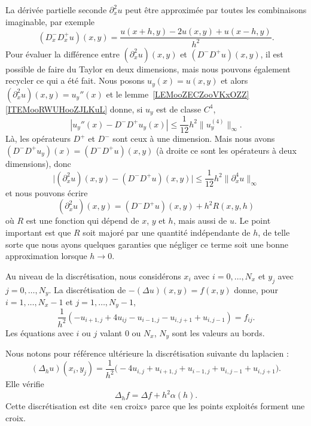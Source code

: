 La dérivée partielle seconde \( \partial^2_xu\) peut être approximée par toutes les combinaisons imaginable, par exemple
\begin{equation}
	(D^-_xD^+_xu)(x,y)=\frac{ u(x+h,y)-2u(x,y)+u(x-h,y) }{ h^2 }.
\end{equation}
Pour évaluer la différence entre \( (\partial^2_xu)(x,y)\) et \( (D^-D^+u)(x,y)\), il est possible de faire du Taylor en deux dimensions, mais nous pouvons également recycler ce qui a été fait. Nous posons \( u_y(x)=u(x,y)\) et alors \( (\partial_x^2u)(x,y)=u_y''(x)\) et le lemme~\ref{LEMooZECZooVKxOZZ}\ref{ITEMooRWUHooZJLKuL} donne, si \( u_y\) est de classe \( C^4\),
\begin{equation}
	| u_y''(x)-D^-D^+u_y(x) |\leq \frac{1}{ 12 }h^2\| u_y^{(4)} \|_{\infty}.
\end{equation}
Là, les opérateurs \( D^+\) et \( D^-\) sont ceux à une dimension. Mais nous avons \( (D^-D^+u_y)(x)=(D^-D^+u)(x,y)\) (à droite ce sont les opérateurs à deux dimensions), donc
\begin{equation}
	\big| (\partial^2_xu)(x,y)-(D^-D^+u)(x,y) \big|\leq \frac{1}{ 12 }h^2\| \partial^4_xu \|_{\infty}
\end{equation}
et nous pouvons écrire
\begin{equation}        \label{EQooCLSCooYLYJkU}
	(\partial^2_xu)(x,y)=(D^-D^+u)(x,y)+h^2R(x,y,h)
\end{equation}
où \( R\) est une fonction qui dépend de \( x\), \( y\) et \( h\), mais aussi de \( u\). Le point important est que \( R\) soit majoré par une quantité indépendante de \( h\), de telle sorte que nous ayons quelques garanties que négliger ce terme soit une bonne approximation lorsque \( h\to 0\).

Au niveau de la discrétisation, nous considérons \( x_i\) avec \( i=0,\ldots, N_x\) et \( y_j\) avec \( j=0,\ldots, N_y\). La discrétisation de \( -(\Delta u)(x,y)=f(x,y)\) donne, pour \( i=1,\ldots, N_x-1\) et \( j=1,\ldots, N_y-1\),
\begin{equation}        \label{EQooPWXBooPimUrU}
	\frac{1}{ h^2 }(-u_{i+1,j}+4u_{ij}-u_{i-1,j}-u_{i,j+1}+u_{i,j-1})=f_{ij}.
\end{equation}
Les équations avec \( i\) ou \( j\) valant \( 0\) ou \( N_x\), \( N_y\) sont les valeurs au bords.

\begin{normaltext}
	Nous notons pour référence ultérieure la discrétisation suivante du laplacien :
	\begin{equation}    \label{EQooQQUHooNYVqta}
		(\Delta_hu)(x_i,y_j)=\frac{1}{ h^2 }\big( -4u_{i,j}+u_{i+1,j}+u_{i-1,j}+u_{i,j-1}+u_{i,j+1} \big).
	\end{equation}
	Elle vérifie
	\begin{equation}
		\Delta_hf=\Delta f+h^2\alpha(h).
	\end{equation}
	Cette discrétisation est dite «en croix» parce que les points exploités forment une croix.
\end{normaltext}

